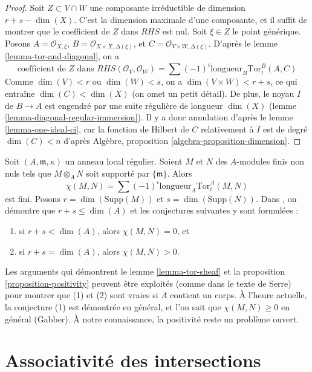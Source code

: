 \begin{proof}
\medskip\noindent
Soit $Z \subset V \cap W$ une composante irréductible de dimension
$r + s - \dim(X)$. C'est la dimension maximale d'une composante,
et il suffit de montrer que le coefficient de $Z$ dans $RHS$ est nul.
Soit $\xi \in Z$ le point générique. Posons $A = \mathcal{O}_{X, \xi}$,
$B = \mathcal{O}_{X \times X, \Delta(\xi)}$, et
$C = \mathcal{O}_{V \times W, \Delta(\xi)}$.
D'après le lemme \ref{lemma-tor-and-diagonal}, on a
$$
\text{coefficient de }Z\text{ dans }
RHS(\mathcal{O}_V, \mathcal{O}_W) = 
\sum (-1)^i
\text{longueur}_B \text{Tor}_i^B(A, C)
$$
Comme $\dim(V) < r$ ou $\dim(W) < s$, on a $\dim(V \times W) < r + s$,
ce qui entraîne $\dim(C) < \dim(X)$ (on omet un petit détail). De plus, le
noyau $I$ de $B \to A$ est engendré par une suite régulière de
longueur $\dim(X)$ (lemme \ref{lemma-diagonal-regular-immersion}).
Il y a donc annulation d'après le lemme \ref{lemma-one-ideal-ci}, car
la fonction de Hilbert de $C$ relativement à $I$ est de degré $\dim(C) < n$
d'après Algèbre, proposition \ref{algebra-proposition-dimension}.
\end{proof}

\begin{remark}
\label{remark-Serre-conjectures}
Soit $(A, \mathfrak m, \kappa)$ un anneau local régulier.
Soient $M$ et $N$ des $A$-modules finis non nuls tels que $M \otimes_A N$
soit supporté par $\{\mathfrak m\}$. Alors
$$
\chi(M, N) = \sum (-1)^i \text{longueur}_A \text{Tor}_i^A(M, N)
$$
est fini. Posons $r = \dim(\text{Supp}(M))$ et $s = \dim(\text{Supp}(N))$.
Dans \cite{Serre_algebre_locale}, on démontre que $r + s \leq \dim(A)$
et les conjectures suivantes y sont formulées :
\begin{enumerate}
\item si $r + s < \dim(A)$, alors $\chi(M, N) = 0$, et
\item si $r + s = \dim(A)$, alors $\chi(M, N) > 0$.
\end{enumerate}
Les arguments qui démontrent le lemme \ref{lemma-tor-sheaf} et
la proposition \ref{proposition-positivity} peuvent être exploités
(comme dans le texte de Serre) pour montrer que (1) et (2) sont
vraies si $A$ contient un corps. À l'heure actuelle, la conjecture (1) est démontrée
en général, et l'on sait que $\chi(M, N) \geq 0$ en général (Gabber).
À notre connaissance, la positivité reste un problème ouvert.
\end{remark}



\section{Associativité des intersections}
\label{section-associative}


